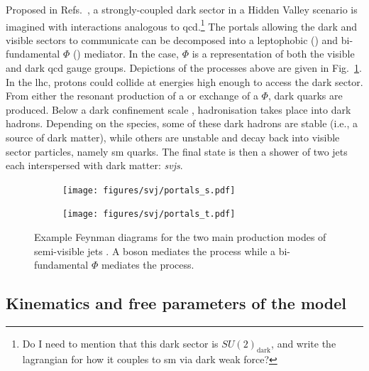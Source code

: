 Proposed in Refs.~, a strongly-coupled dark sector in a Hidden Valley scenario is imagined with interactions analogous to \acrshort{qcd}.\footnote{Do I need to mention that this dark sector is $SU(2)_{\mathrm{dark}}$, and write the lagrangian for how it couples to \acrshort{sm} via dark weak force?} The portals allowing the dark and visible sectors to communicate can be decomposed into a leptophobic \PZprime (\schannel) and bi-fundamental $\Phi$ (\tchannel) mediator. In the \tchannel case, $\Phi$ is a representation of both the visible and dark \acrshort{qcd} gauge groups. Depictions of the processes above are given in Fig.~\ref{fig:theory_svj_portals}. In the \acrshort{lhc}, protons could collide at energies high enough to access the dark sector. From either the resonant production of a \PZprime or exchange of a $\Phi$, dark quarks \Pqdark are produced. Below a dark confinement scale \lamDark, hadronisation takes place into dark hadrons. Depending on the species, some of these dark hadrons are stable (i.e., a source of dark matter), while others are unstable and decay back into visible sector particles, namely \acrlong{sm} quarks. The final state is then a shower of two \glspl{jet} each interspersed with dark matter: \emph{\glspl{svj}}.

\begin{figure}[htbp]
    \centering
    \begin{subfigure}[c]{0.45\textwidth}
    \centering
        \texttt{[image: figures/svj/portals\_s.pdf]}
        \caption{\schannel}
    \end{subfigure}
    \hfill
    \begin{subfigure}[c]{0.45\textwidth}
    \centering
        \texttt{[image: figures/svj/portals\_t.pdf]}
        \caption{\tchannel}
    \end{subfigure}
\caption[Example Feynman diagrams for the two main production modes of semi-visible jets. A \PZprime boson mediates the \schannel process while a bi-fundamental $\Phi$ mediates the \tchannel process]{Example Feynman diagrams for the two main production modes of semi-visible jets \cite{Cohen:2017pzm}. A \PZprime boson mediates the \schannel process while a bi-fundamental $\Phi$ mediates the \tchannel process.}
\label{fig:theory_svj_portals}
\end{figure}




\subsection{Kinematics and free parameters of the model}
\label{subsec:theory_svj_free_params}

